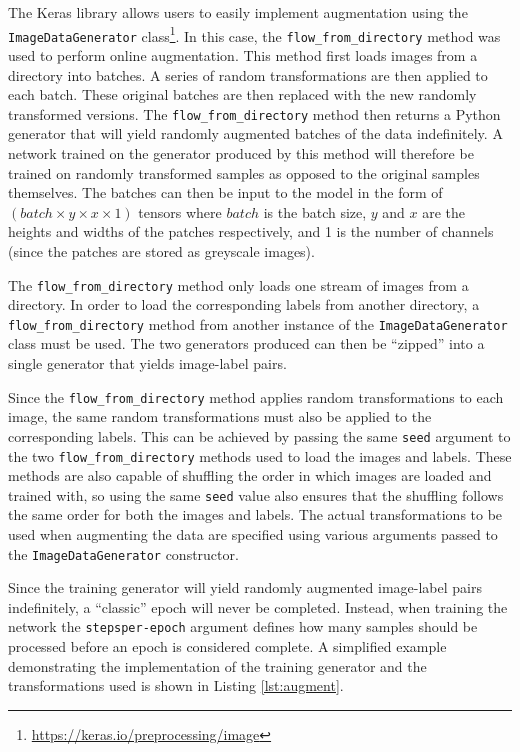 The Keras library allows users to easily implement augmentation using the \texttt{ImageDataGenerator} class\footnote{\url{https://keras.io/preprocessing/image}}. In this case, the \texttt{flow\_from\_directory} method was used to perform online augmentation. This method first loads images from a directory into batches. A series of random transformations are then applied to each batch. These original batches are then replaced with the new randomly transformed versions. The \texttt{flow\_from\_directory} method then returns a Python generator that will yield randomly augmented batches of the data indefinitely. A network trained on the generator produced by this method will therefore be trained on randomly transformed samples as opposed to the original samples themselves. The batches can then be input to the model in the form of $(batch \times y \times x \times 1)$ tensors where $batch$ is the batch size, $y$ and $x$ are the heights and widths of the patches respectively, and 1 is the number of channels (since the patches are stored as greyscale images).

The \texttt{flow\_from\_directory} method only loads one stream of images from a directory. In order to load the corresponding labels from another directory, a \texttt{flow\_from\_directory} method from another instance of the \texttt{ImageDataGenerator} class must be used. The two generators produced can then be ``zipped'' into a single generator that yields image-label pairs.

Since the \texttt{flow\_from\_directory} method applies random transformations to each image, the same random transformations must also be applied to the corresponding labels. This can be achieved by passing the same \texttt{seed} argument to the two \texttt{flow\_from\_directory} methods used to load the images and labels. These methods are also capable of shuffling the order in which images are loaded and trained with, so using the same \texttt{seed} value also ensures that the shuffling follows the same order for both the images and labels. The actual transformations to be used when augmenting the data are specified using various arguments passed to the \texttt{ImageDataGenerator} constructor.

Since the training generator will yield randomly augmented image-label pairs indefinitely, a ``classic'' epoch will never be completed. Instead, when training the network the \texttt{steps\-per-epoch} argument defines how many samples should be processed before an epoch is considered complete. A simplified example demonstrating the implementation of the training generator and the transformations used is shown in Listing \ref{lst:augment}.

